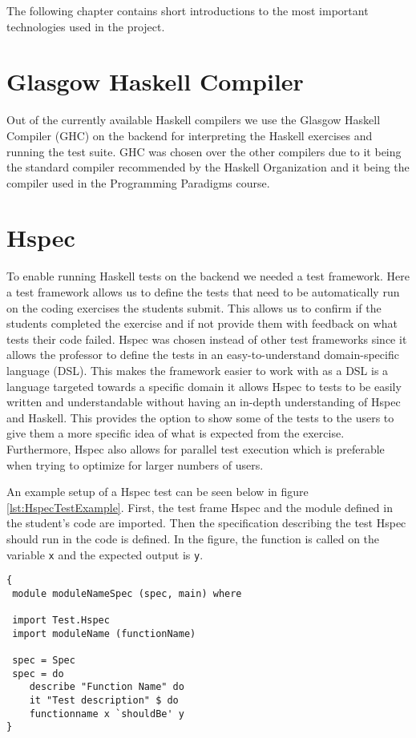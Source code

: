 The following chapter contains short introductions to the most important technologies used in the project. 

\section*{Glasgow Haskell Compiler} %
Out of the currently available Haskell compilers we use the Glasgow Haskell Compiler (GHC) on the backend for interpreting the Haskell exercises and running the test suite. GHC was chosen over the other compilers due to it being the standard compiler recommended by the Haskell Organization \cite{Haskell_GHC} and it being the compiler used in the Programming Paradigms course.

\section*{Hspec}
To enable running Haskell tests on the backend we needed a test framework. Here a test framework allows us to define the tests that need to be automatically run on the coding exercises the students submit. This allows us to confirm if the students completed the exercise and if not provide them with feedback on what tests their code failed.
Hspec was chosen instead of other test frameworks since it allows the professor to define the tests in an easy-to-understand domain-specific language (DSL). 
This makes the framework easier to work with as a DSL is a language targeted towards a specific domain it allows Hspec to tests to be easily written and understandable without having an in-depth understanding of Hspec and Haskell. 
This provides the option to show some of the tests to the users to give them a more specific idea of what is expected from the exercise. 
Furthermore, Hspec also allows for parallel test execution which is preferable when trying to optimize for larger numbers of users.

An example setup of a Hspec test can be seen below in figure \ref{lst:HspecTestExample}. First, the test frame Hspec and the module defined in the student’s code are imported. Then the specification describing the test Hspec should run in the code is defined. In the figure, the function is called on the variable \texttt{x} and the expected output is \texttt{y}.

\begin{lstlisting}[language=CSharp, caption={An example of a Hspec Test.}, label={lst:HspecTestExample}]
{
 module moduleNameSpec (spec, main) where

 import Test.Hspec
 import moduleName (functionName)
 
 spec = Spec
 spec = do
 	describe "Function Name" do
 	it "Test description" $ do
	functionname x `shouldBe' y
}
\end{lstlisting}

